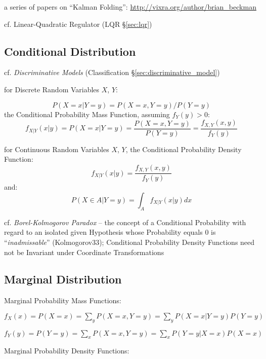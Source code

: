 a series of papers on ``Kalman Folding'':
\url{http://vixra.org/author/brian_beckman}

cf. Linear-Quadratic Regulator (LQR \S\ref{sec:lqr})



\subsection{Conditional Distribution}\label{sec:conditional_distribution}

cf. \emph{Discriminative Models} (Classification
\S\ref{sec:discriminative_model})

for Discrete Random Variables $X$, $Y$:

\[
  P(X = x | Y = y) = P(X = x, Y = y)/P(Y = y)
\]
the Conditional Probability Mass Function, assuming $f_Y(y) > 0$:
\[
  f_{X|Y}(x|y) = P(X = x|Y = y) =
    \frac{P(X = x, Y = y)}{P(Y = y)} =
    \frac{f_{X,Y}(x,y)}{f_Y(y)}
\]

for Continuous Random Variables $X$, $Y$, the Conditional Probability Density
Function:
\[
  f_{X|Y}(x|y) = \frac{f_{X,Y}(x,y)}{f_Y(y)}
\]
and:
\[
  P(X \in A| Y = y) = \int_A f_{X|Y}(x|y) dx
\]

cf. \emph{Borel-Kolmogorov Paradox} -- the concept of a Conditional Probability
with regard to an isolated given Hypothesis whose Probability equals $0$ is
``\emph{inadmissable}'' (Kolmogorov33); Conditional Probability Density
Functions need not be Invariant under Coordinate Transformations



\subsection{Marginal Distribution}\label{sec:marginal_distribution}

Marginal Probability Mass Functions:

$f_X(x) = P(X = x) = \sum_y P(X = x, Y = y) = \sum_y P(X = x | Y = y) P(Y = y)$

$f_Y(y) = P(Y = y) = \sum_x P(X = x, Y = y) = \sum_x P(Y = y | X = x) P(X = x)$

Marginal Probability Density Functions:

